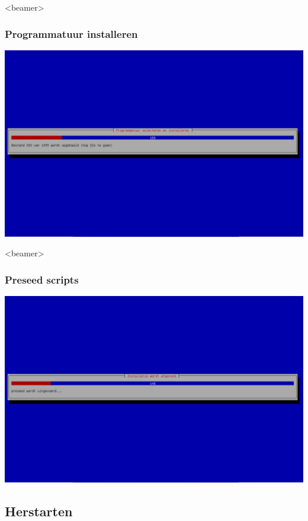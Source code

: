 \documentclass{beamer}
\begin{document}
\begin{frame}<beamer>
  \frametitle{Programmatuur installeren}
   
   \centering
   \includegraphics[width=\textwidth]{img/programmatuur.png}
\end{frame}

\begin{frame}<beamer>
  \frametitle{Preseed scripts}
   
   \centering
   \includegraphics[width=\textwidth]{img/preseed.png}
\end{frame}

\subsection{Herstarten}
\end{document}
